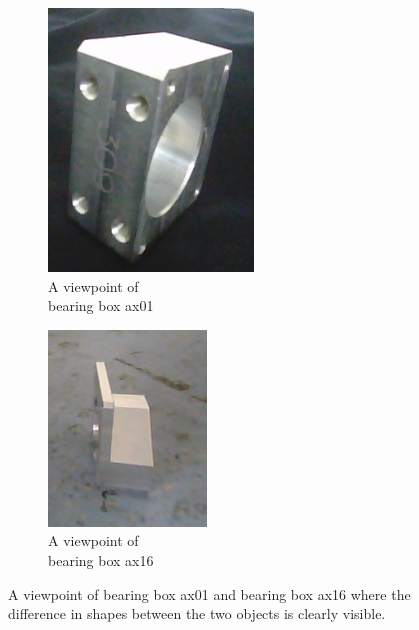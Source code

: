\begin{itemize}
\begin{figure}[h]
	\centering
	\begin{subfigure}{.3\textwidth}
  		\centering
  		\includegraphics[width=.5\linewidth]{images/ax01_diff}
  		\caption{A viewpoint of \\bearing box ax01}
  		\label{Fig:sim1a}
	\end{subfigure}%
	\begin{subfigure}{.3\textwidth}
  		\centering
  		\includegraphics[width=.5\linewidth]{images/ax16_diff}
  		\caption{A viewpoint of \\bearing box ax16}
  		\label{Fig:sim1b}
	\end{subfigure}%
	\caption{A viewpoint of bearing box ax01 and bearing box ax16 where the difference in shapes between the two objects is clearly visible.}
	\label{Fig:sim1}
\end{figure}


\end{itemize}
